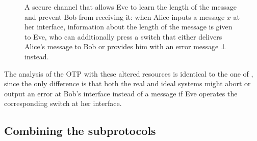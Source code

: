 \begin{figure}[tb]




\caption[Secure channel with a switch]{\label{fig:secure.resource}A
  secure channel that allows Eve to learn the length of the message
  and prevent Bob from receiving it: when Alice inputs a message $x$
  at her interface, information about the length of the message is
  given to Eve, who can additionally press a switch that either delivers
  Alice's message to Bob or provides him with an error message $\bot$
  instead.}
\end{figure}

The analysis of the OTP with these altered resources is identical to
the one of , since the only difference is that both
the real and ideal systems might abort or output an error at Bob's
interface instead of a message if Eve operates the corresponding
switch at her interface.


\subsection{Combining the subprotocols}
\label{sec:smt.together}

